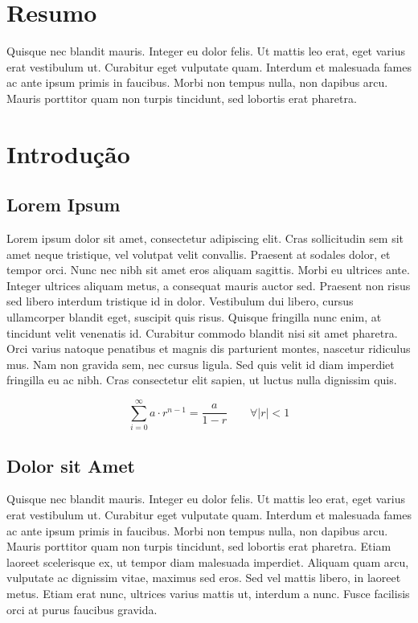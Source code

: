 \section*{Resumo}
Quisque nec blandit mauris. Integer eu dolor felis. Ut mattis leo erat, eget varius erat vestibulum ut. Curabitur eget vulputate quam. Interdum et malesuada fames ac ante ipsum primis in faucibus. Morbi non tempus nulla, non dapibus arcu. Mauris porttitor quam non turpis tincidunt, sed lobortis erat pharetra.

\section{Introdução}
\subsection{Lorem Ipsum}
 Lorem ipsum dolor sit amet, consectetur adipiscing elit. Cras sollicitudin sem sit amet neque tristique, vel volutpat velit convallis. Praesent at sodales dolor, et tempor orci. Nunc nec nibh sit amet eros aliquam sagittis. Morbi eu ultrices ante. Integer ultrices aliquam metus, a consequat mauris auctor sed. Praesent non risus sed libero interdum tristique id in dolor. Vestibulum dui libero, cursus ullamcorper blandit eget, suscipit quis risus. Quisque fringilla nunc enim, at tincidunt velit venenatis id. Curabitur commodo blandit nisi sit amet pharetra. Orci varius natoque penatibus et magnis dis parturient montes, nascetur ridiculus mus. Nam non gravida sem, nec cursus ligula. Sed quis velit id diam imperdiet fringilla eu ac nibh. Cras consectetur elit sapien, ut luctus nulla dignissim quis.
 
 $$
     \sum_{i=0}^{\infty} a \cdot r^{n-1} = \frac{a}{1-r}
     \qquad \forall |r| < 1
 $$

\subsection{Dolor sit Amet}
Quisque nec blandit mauris. Integer eu dolor felis. Ut mattis leo erat, eget varius erat vestibulum ut. Curabitur eget vulputate quam. Interdum et malesuada fames ac ante ipsum primis in faucibus. Morbi non tempus nulla, non dapibus arcu. Mauris porttitor quam non turpis tincidunt, sed lobortis erat pharetra. Etiam laoreet scelerisque ex, ut tempor diam malesuada imperdiet. Aliquam quam arcu, vulputate ac dignissim vitae, maximus sed eros. Sed vel mattis libero, in laoreet metus. Etiam erat nunc, ultrices varius mattis ut, interdum a nunc. Fusce facilisis orci at purus faucibus gravida. 
